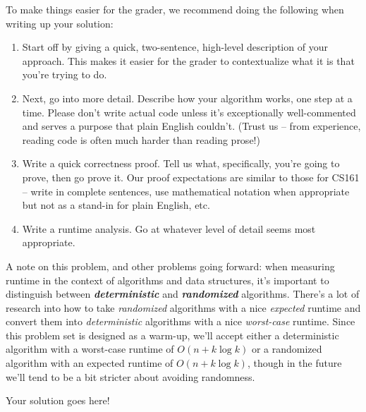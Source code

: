 \documentclass[12pt]{exam}
\newcommand*{\bigo}[1]{O \left( #1 \right)}
\newcommand{\bi}[1]{\textit{\textbf{#1}}}
\begin{document}
\begin{questions}
To make things easier for the grader, we recommend doing the following when writing up your solution:
\begin{enumerate}
    \item Start off by giving a quick, two-sentence, high-level description of your approach. This makes it easier for the grader to contextualize what it is that you're trying to do. 
    \item Next, go into more detail. Describe how your algorithm works, one step at a time. Please don't write actual code unless it's exceptionally well-commented and serves a purpose that plain English couldn't. (Trust us -- from experience, reading code is often much harder than reading prose!)
    \item Write a quick correctness proof. Tell us what, specifically, you're going to prove, then go prove it. Our proof expectations are similar to those for CS161 -- write in complete sentences, use mathematical notation when appropriate but not as a stand-in for plain English, etc. 
    \item Write a runtime analysis. Go at whatever level of detail seems most appropriate.
\end{enumerate}

A note on this problem, and other problems going forward: when measuring runtime in the context of algorithms and data structures, it's important to distinguish between \bi{deterministic} and \bi{randomized} algorithms. There's a lot of research into how to take \emph{randomized} algorithms with a nice \emph{expected} runtime and convert them into \emph{deterministic} algorithms with a nice \emph{worst-case} runtime. Since this problem set is designed as a warm-up, we'll accept either a deterministic algorithm with a worst-case runtime of $O(n + k \log k)$ or a randomized algorithm with an expected runtime of $\bigo{n + k \log k}$, though in the future we'll tend to be a bit stricter about avoiding randomness.

\begin{solution}
Your solution goes here!
\end{solution}


\end{questions}
\end{document}
